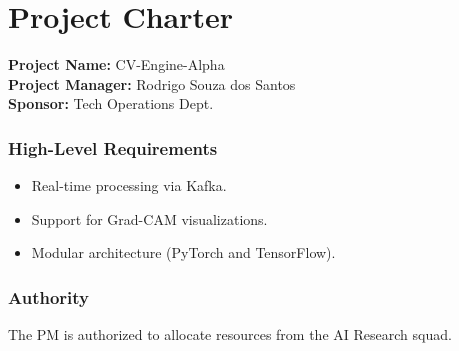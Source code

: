 \documentclass[
]{report}
\author{}
\date{}
\providecommand{\tightlist}{%
  \setlength{\itemsep}{0pt}\setlength{\parskip}{0pt}}
\begin{document}
\newcommand{\theProjectName}{NOAA}
\newcommand{\theAuthor}{Rodrigo Souza dos Santos}

\chapter{Project Charter}\label{project-charter}

\textbf{Project Name:} CV-Engine-Alpha\\
\textbf{Project Manager:} Rodrigo Souza dos Santos\\
\textbf{Sponsor:} Tech Operations Dept.

\subsection{High-Level Requirements}\label{high-level-requirements}

\begin{itemize}
\tightlist
\item
  Real-time processing via Kafka.
\item
  Support for Grad-CAM visualizations.
\item
  Modular architecture (PyTorch and TensorFlow).
\end{itemize}

\subsection{Authority}\label{authority}

The PM is authorized to allocate resources from the AI Research squad.
\end{document}
